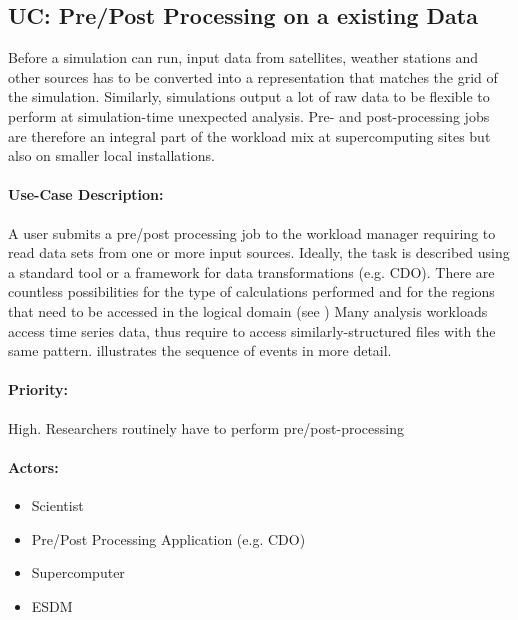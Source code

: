 \subsection{UC: Pre/Post Processing on a existing Data}
\label{uc: pre + post processing}

Before a simulation can run, input data from satellites, weather stations and other sources has to be converted into a representation that matches the grid of the simulation.
Similarly, simulations output a lot of raw data to be flexible to perform at simulation-time unexpected analysis.
Pre- and post-processing jobs are therefore an integral part of the workload mix at supercomputing sites but also on smaller local installations.


\paragraph{Use-Case Description:}
A user submits a pre/post processing job to the workload manager requiring to read data sets from one or more input sources.
Ideally, the task is described using a standard tool or a framework for data transformations (e.g. CDO).
There are countless possibilities for the type of calculations performed and for the regions that need to be accessed in the logical domain (see )
Many analysis workloads access time series data, thus require to access similarly-structured files with the same pattern.
 illustrates the sequence of events in more detail.

\paragraph{Priority:} High. Researchers routinely have to perform pre/post-processing

\paragraph{Actors:}
\begin{itemize}
	\item Scientist
	\item Pre/Post Processing Application (e.g. CDO)
	\item Supercomputer
	\item ESDM
\end{itemize}


